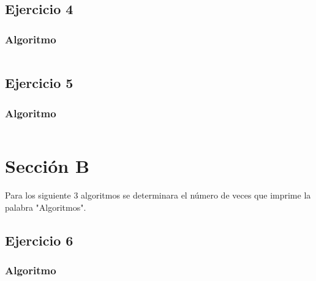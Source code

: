 \documentclass[12pt, letterpaper]{article}			%
\begin{document}
	    \subsection{Ejercicio 4}
	    	\subsubsection{Algoritmo}
	        \begin{lstlisting}[style=Java]

    		\end{lstlisting}

	    \subsection{Ejercicio 5}
	    	\subsubsection{Algoritmo}
	        \begin{lstlisting}[style=Java]

    		\end{lstlisting}


	\section{Sección B}
	Para los siguiente 3 algoritmos se determinara el número de veces que imprime la palabra "Algoritmos". 

	    \subsection{Ejercicio 6}
			\subsubsection{Algoritmo}	    
    			\begin{lstlisting}[style=Java]
    		    
    			\end{lstlisting}
    		
\end{document}
